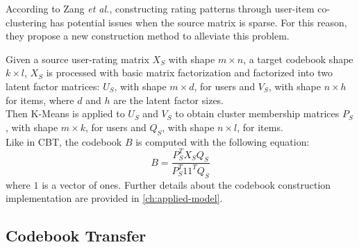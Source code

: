 According to Zang \textit{et al.}, constructing rating patterns through user-item co-clustering has potential issues when the source matrix is sparse. For this reason, they propose a new construction method to alleviate this problem.\par
Given a source user-rating matrix $X_S$ with shape $m \times n$, a target codebook shape $k \times l$, $X_S$ is processed with basic matrix factorization and factorized into two latent factor matrices: $U_S$, with shape $m \times d$, for users and $V_S$, with shape $n \times h$ for items, where $d$ and $h$ are the latent factor sizes.\\
Then K-Means is applied to $U_S$ and $V_S$ to obtain cluster membership matrices $P_S$, with shape $m \times k$, for users and $Q_S$, with shape $n \times l$, for items.\\
Like in CBT, the codebook $B$ is computed with the following equation:
\begin{equation}
B = \frac{P_S^T X_S Q_S}{P_S^T 1 1^T Q_S}
\end{equation}
where $1$ is a vector of ones.
Further details about the codebook construction implementation are provided in \autoref{ch:applied-model}.


\subsection{Codebook Transfer}

